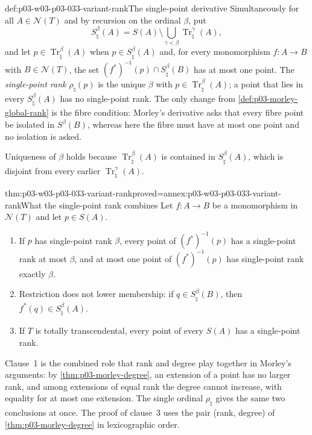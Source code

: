 \begin{hbdefinition}{def:p03-w03-p03-033-variant-rank}{The single-point derivative}
Simultaneously for all \(A\in\mathcal N(T)\) and by recursion on the
ordinal \(\beta\), put
\[
 S_\natural^\beta(A)=S(A)\setminus\bigcup_{\gamma<\beta}
                  \operatorname{Tr}_\natural^\gamma(A),
\]
and let \(p\in\operatorname{Tr}_\natural^\beta(A)\) when
\(p\in S_\natural^\beta(A)\) and, for every monomorphism
\(f:A\to B\) with \(B\in\mathcal N(T)\), the set
\((f^*)^{-1}(p)\cap S_\natural^\beta(B)\) has at most one point.
The \emph{single-point rank} \(\rho_\natural(p)\) is the unique
\(\beta\) with \(p\in\operatorname{Tr}_\natural^\beta(A)\); a point that
lies in every \(S_\natural^\beta(A)\) has no single-point rank.
The only change from \cref{def:p03-morley-global-rank} is the fibre
condition: Morley's derivative asks that every fibre point be isolated in
\(S^\beta(B)\), whereas here the fibre must have at most one point and no
isolation is asked.
\end{hbdefinition}

Uniqueness of \(\beta\) holds because \(\operatorname{Tr}_\natural^\beta(A)\)
is contained in \(S_\natural^\beta(A)\), which is disjoint from every
earlier \(\operatorname{Tr}_\natural^\gamma(A)\).

\begin{hbtheorem}{thm:p03-w03-p03-033-variant-rank}{proved=annex:p03-w03-p03-033-variant-rank}{What the single-point rank combines}
Let \(f:A\to B\) be a monomorphism in \(\mathcal N(T)\) and let
\(p\in S(A)\).
\begin{enumerate}
\item If \(p\) has single-point rank \(\beta\), every point of
\((f^*)^{-1}(p)\) has a single-point rank at most \(\beta\), and at most
one point of \((f^*)^{-1}(p)\) has single-point rank exactly \(\beta\).
\item Restriction does not lower membership: if
\(q\in S_\natural^\beta(B)\), then \(f^*(q)\in S_\natural^\beta(A)\).
\item If \(T\) is totally transcendental, every point of every
\(S(A)\) has a single-point rank.
\end{enumerate}
\end{hbtheorem}

Clause~1 is the combined role that rank and degree play together in
Morley's arguments: by \cref{thm:p03-morley-degree}, an extension of a
point has no larger rank, and among extensions of equal rank the degree
cannot increase, with equality for at most one extension. The single
ordinal \(\rho_\natural\) gives the same two conclusions at once. The proof
of clause~3 uses the pair (rank, degree) of \cref{thm:p03-morley-degree}
in lexicographic order.

